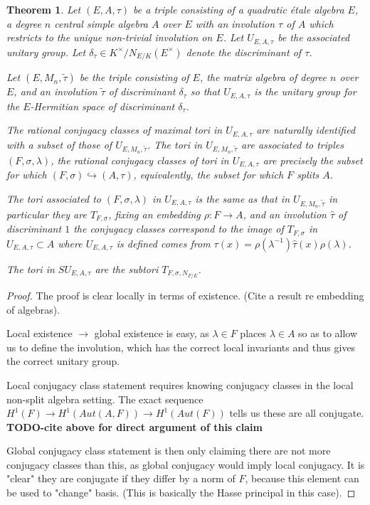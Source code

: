 \documentclass{article}
\theoremstyle{plain}
\newtheorem{theorem}{Theorem}[section]
\theoremstyle{definition}
\numberwithin{equation}{section}
\newcommand{\TODO}[1]{\textbf{TODO-#1}}
\begin{document}
\begin{theorem}
Let $(E,A,\tau)$ be a triple consisting of a quadratic \'etale algebra $E$, a degree $n$ central simple algebra $A$ over $E$ with an involution $\tau$ of $A$ which restricts to the unique non-trivial involution on $E$. Let $U_{E,A,\tau}$ be the associated unitary group. Let $\delta_{\tau} \in K^\times/N_{E/K}(E^\times)$ denote the discriminant of $\tau$.

Let $(E,M_n,\tilde{\tau})$ be the triple consisting of $E$, the matrix algebra of degree $n$ over $E$, and an involution $\tilde{\tau}$ of discriminant $\delta_{\tau}$ so that $U_{E,A,\tau}$ is the unitary group for the $E$-Hermitian space of discriminant $\delta_{\tau}$.

The rational conjugacy classes of maximal tori in $U_{E,A,\tau}$ are naturally identified with a subset of those of $U_{E,M_n,\tilde{\tau}}$.
The tori in $U_{E,M_n,\tilde{\tau}}$ are associated to triples $(F,\sigma,\lambda)$, the rational conjugacy classes of tori in $U_{E,A,\tau}$ are precisely the subset for which $(F,\sigma)\hookrightarrow (A,\tau)$, equivalently, the subset for which $F$ splits $A$.

The tori associated to $(F,\sigma,\lambda)$ in $U_{E,A,\tau}$ is the same as that in $U_{E,M_n,\tilde{\tau}}$ in particular they are $T_{F,\sigma}$, fixing an embedding $\rho : F \rightarrow A$, and an involution $\hat\tau$ of discriminant $1$ the conjugacy classes correspond to the image of $T_{F,\sigma}$ in $U_{E,A,\tau} \subset A$ where $U_{E,A,\tau}$ is defined comes from $\tau(x) = \rho(\lambda^{-1})\hat\tau(x)\rho(\lambda)$.

The tori in $SU_{E,A,\tau}$ are the subtori $T_{F,\sigma,N_{F/E}}$.
\end{theorem}
\begin{proof}
The proof is clear locally in terms of existence. 
(Cite a result re embedding of algebras).

Local existence $\to$ global existence is easy, as $\lambda \in F$ places $\lambda \in A$ so as to allow us to define the involution, which has the correct local invariants and thus gives the correct unitary group.

Local conjugacy class statement requires knowing conjugacy classes in the local non-split algebra setting. 
The exact sequence $H^1(F) \rightarrow H^1(Aut(A,F)) \rightarrow H^1(Aut(F))$ tells us these are all conjugate.
\TODO{cite above for direct argument of this claim}

Global conjugacy class statement is then only claiming there are not more conjugacy classes than this, as global conjugacy would imply local conjugacy.
It is "clear" they are conjugate if they differ by a norm of $F$, because this element can be used to "change" basis.
(This is basically the Hasse principal in this case).
\end{proof}
\end{document}
